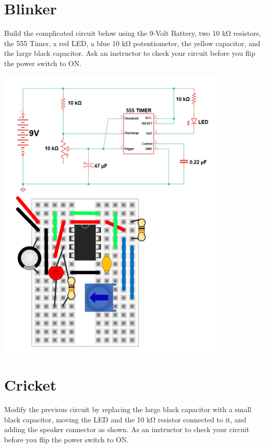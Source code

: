 \documentclass[
]{book}
\begin{document}
\hypertarget{blinker}{%
\chapter{Blinker}\label{blinker}}

Build the complicated circuit below using the 9-Volt Battery, two 10 kΩ resistors, the 555 Timer, a red LED, a blue 10 kΩ potentiometer, the yellow capacitor, and the large black capacitor.
Ask an instructor to check your circuit before you flip the power switch to ON.

\includegraphics{images/blinker_diagram.png}

\hypertarget{cricket}{%
\chapter{Cricket}\label{cricket}}

Modify the previous circuit by replacing the large black capacitor with a small black capacitor, moving the LED and the 10 kΩ resistor connected to it, and adding the speaker connector as shown.
As an instructor to check your circuit before you flip the power switch to ON.
\end{document}
